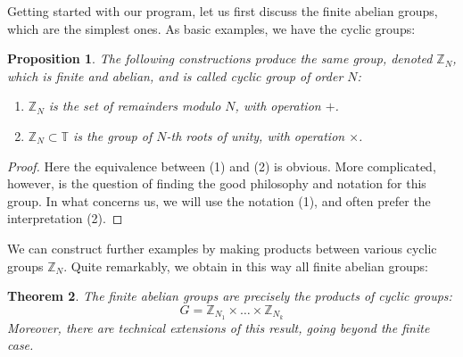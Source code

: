 \documentclass[12pt]{amsbook}
\newtheorem{theorem}{Theorem}[chapter]
\newtheorem{proposition}[theorem]{Proposition}
\begin{document}
\bigskip

Getting started with our program, let us first discuss the finite abelian groups, which are the simplest ones. As basic examples, we have the cyclic groups:


\begin{proposition}
The following constructions produce the same group, denoted $\mathbb Z_N$, which is finite and abelian, and is called cyclic group of order $N$:
\begin{enumerate}
\item $\mathbb Z_N$ is the set of remainders modulo $N$, with operation $+$. 

\item $\mathbb Z_N\subset\mathbb T$ is the group of $N$-th roots of unity, with operation $\times$. 
\end{enumerate}
\end{proposition}

\begin{proof}
Here the equivalence between (1) and (2) is obvious. More complicated, however, is the question of finding the good philosophy and notation for this group. In what concerns us, we will use the notation (1), and often prefer the interpretation (2).
\end{proof}

We can construct further examples by making products between various cyclic groups $\mathbb Z_N$. Quite remarkably, we obtain in this way all finite abelian groups:


\begin{theorem}
The finite abelian groups are precisely the products of cyclic groups: 
$$G=\mathbb Z_{N_1}\times\ldots\times\mathbb Z_{N_k}$$
Moreover, there are technical extensions of this result, going beyond the finite case.
\end{theorem}
\end{document}
